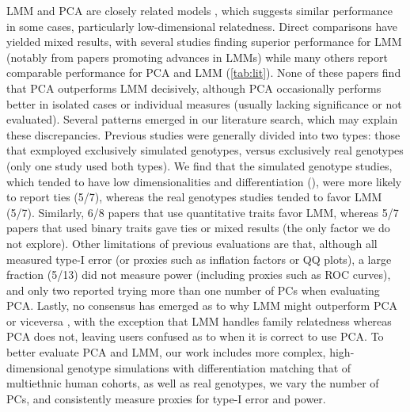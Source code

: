 \documentclass[11pt]{article}
\begin{document}
LMM and PCA are closely related models \citep{astle_population_2009, hoffman_correcting_2013}, which suggests similar performance in some cases, particularly low-dimensional relatedness.
Direct comparisons have yielded mixed results, with several studies finding superior performance for LMM (notably from papers promoting advances in LMMs) while many others report comparable performance for PCA and LMM (\cref{tab:lit}).
None of these papers find that PCA outperforms LMM decisively, although PCA occasionally performs better in isolated cases or individual measures (usually lacking significance or not evaluated).
Several patterns emerged in our literature search, which may explain these discrepancies.
Previous studies were generally divided into two types: those that exmployed exclusively simulated genotypes, versus exclusively real genotypes (only one study used both types).
We find that the simulated genotype studies, which tended to have low dimensionalities and differentiation (\Fst), were more likely to report ties (5/7), whereas the real genotypes studies tended to favor LMM (5/7).
Similarly, 6/8 papers that use quantitative traits favor LMM, whereas 5/7 papers that used binary traits gave ties or mixed results (the only factor we do not explore).
Other limitations of previous evaluations are that, although all measured type-I error (or proxies such as inflation factors or QQ plots), a large fraction (5/13) did not measure power (including proxies such as ROC curves), and only two reported trying more than one number of PCs when evaluating PCA.
Lastly, no consensus has emerged as to why LMM might outperform PCA or viceversa \citep{price_new_2010, sul_mixed_2013, price_response_2013, hoffman_correcting_2013}, with the exception that LMM handles family relatedness whereas PCA does not, leaving users confused as to when it is correct to use PCA.
To better evaluate PCA and LMM, our work includes more complex, high-dimensional genotype simulations with differentiation matching that of multiethnic human cohorts, as well as real genotypes, we vary the number of PCs, and consistently measure proxies for type-I error and power.
\end{document}

